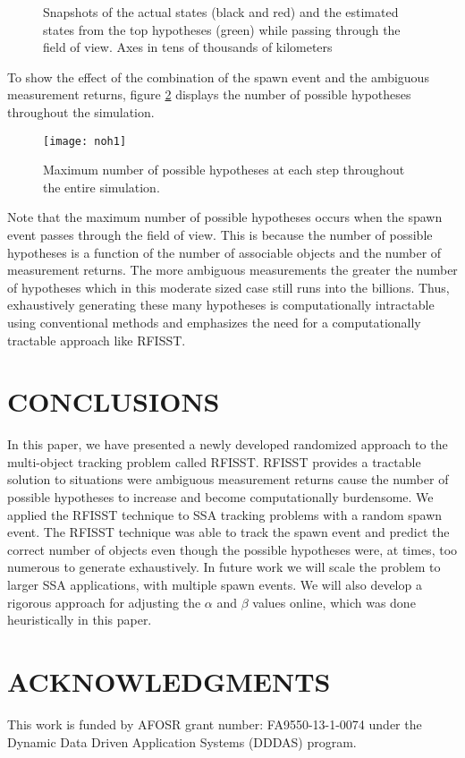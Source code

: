 \documentclass[10pt, conference]{IEEEtran}
\begin{document}
\begin{figure}[H]
\centering
{}


\caption{Snapshots of the actual states (black and red) and the estimated states from the top hypotheses (green) while passing through the field of view. Axes in tens of thousands of kilometers}
\label{20Spawn}
\end{figure}

To show the effect of the combination of the spawn event and the ambiguous measurement returns, figure \ref{NHs}
displays the number of possible hypotheses throughout the simulation. 

\begin{figure}[H]
\centering
\texttt{[image: noh1]}
\caption{Maximum number of possible hypotheses at each step throughout the entire simulation.}
\label{NHs}
\end{figure}
Note that the maximum number of possible hypotheses occurs when the spawn event passes through the field of view. This is because the number of possible hypotheses is a function of the number of associable objects and the number of measurement returns. The more ambiguous measurements the greater the number of hypotheses which in this moderate sized case still runs into the billions. Thus, exhaustively generating these many hypotheses is computationally intractable using conventional methods and emphasizes the need for a computationally tractable approach like RFISST. 









\section{CONCLUSIONS}
In this paper, we have presented a newly developed randomized approach to the multi-object tracking problem called RFISST. RFISST provides a tractable solution to situations were ambiguous measurement returns cause the number of possible hypotheses to increase and become computationally burdensome. We applied the RFISST technique to SSA tracking problems with a random spawn event. The RFISST technique was able to track the spawn event and predict the correct number of objects even though the possible hypotheses were, at times, too numerous to generate exhaustively. In future work we will scale the problem to larger SSA applications, with multiple spawn events.  We will also develop a rigorous approach for adjusting the $\alpha$ and $\beta$ values online, which was done heuristically in this paper. 
\section{ACKNOWLEDGMENTS}
\label{.7}
This work is funded by AFOSR grant number: FA9550-13-1-0074 under the Dynamic Data Driven Application Systems (DDDAS) program.











\end{document}
